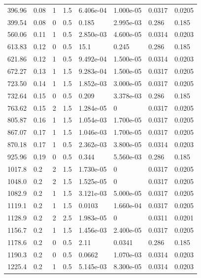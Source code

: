 \documentclass[preview]{standalone}
\begin{document}
{{\begin{tabular}{L{1.2cm}C{1.2cm} C{0.3cm}C{0.5cm} C{1.4cm}C{1.4cm} C{1.4cm}C{1.4cm}}
  396.96  &  0.08  & 1     & 1.5 &  6.406e-04  & 1.000e-05  & 0.0317 &  0.0205   \\ 
  399.54  &  0.08  & 0     & 0.5 &  0.185  & 2.995e-03  & 0.286 &  0.185   \\ 
  560.06  &  0.11  & 1     & 0.5 &  2.850e-03  & 4.600e-05  & 0.0314 &  0.0203   \\ 
  613.83  &  0.12  & 0     & 0.5 &  15.1  & 0.245  & 0.286 &  0.185   \\ 
  621.86  &  0.12  & 1     & 0.5 &  9.492e-04  & 1.500e-05  & 0.0314 &  0.0203   \\ 
  672.27  &  0.13  & 1     & 1.5 &  9.283e-04  & 1.500e-05  & 0.0317 &  0.0205   \\ 
  723.50  &  0.14  & 1     & 1.5 &  1.852e-03  & 3.000e-05  & 0.0317 &  0.0205   \\ 
  732.64  &  0.15  & 0     & 0.5 &  0.209  & 3.378e-03  & 0.286 &  0.185   \\ 
  763.62  &  0.15  & 2     & 1.5 &  1.284e-05  & 0  & 0.0317 &  0.0205   \\ 
  805.87  &  0.16  & 1     & 1.5 &  1.054e-03  & 1.700e-05  & 0.0317 &  0.0205   \\ 
  867.07  &  0.17  & 1     & 1.5 &  1.046e-03  & 1.700e-05  & 0.0317 &  0.0205   \\ 
  870.18  &  0.17  & 1     & 0.5 &  2.362e-03  & 3.800e-05  & 0.0314 &  0.0203   \\ 
  925.96  &  0.19  & 0     & 0.5 &  0.344  & 5.560e-03  & 0.286 &  0.185   \\ 
  1017.8  &   0.2  & 2     & 1.5 &  1.730e-05  & 0  & 0.0317 &  0.0205   \\ 
  1048.0  &   0.2  & 2     & 1.5 &  1.525e-05  & 0  & 0.0317 &  0.0205   \\ 
  1082.9  &   0.2  & 1     & 1.5 &  3.121e-03  & 5.000e-05  & 0.0317 &  0.0205   \\ 
  1119.1  &   0.2  & 1     & 1.5 &  0.0103  & 1.660e-04  & 0.0317 &  0.0205   \\ 
  1128.9  &   0.2  & 2     & 2.5 &  1.983e-05  & 0  & 0.0311 &  0.0201   \\ 
  1156.7  &   0.2  & 1     & 1.5 &  1.456e-03  & 2.400e-05  & 0.0317 &  0.0205   \\ 
  1178.6  &   0.2  & 0     & 0.5 &  2.11  & 0.0341  & 0.286 &  0.185   \\ 
  1190.3  &   0.2  & 0     & 0.5 &  0.0662  & 1.070e-03  & 0.0314 &  0.0203   \\ 
  1225.4  &   0.2  & 1     & 0.5 &  5.145e-03  & 8.300e-05  & 0.0314 &  0.0203   \\ 

\end{tabular}}}
\end{document}
